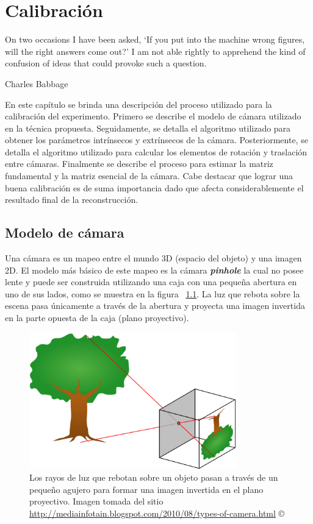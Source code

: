\chapter{Calibraci\'{o}n}
\label{chap:calibracion}
\epigraph{On two occasions I have been asked, ‘If you put into the machine wrong figures, will the right answers come out?’  I am not able rightly to apprehend the kind of confusion of ideas that could provoke such a question.}{Charles Babbage}

En este cap\'{i}tulo se brinda una descripci\'{o}n del proceso utilizado para la calibraci\'{o}n del experimento. Primero se describe el modelo de c\'{a}mara utilizado en la t\'{e}cnica propuesta. Seguidamente, se detalla el algoritmo utilizado para obtener los par\'{a}metros intr\'{i}nsecos y extr\'{i}nsecos de la c\'{a}mara. Posteriormente, se detalla el algoritmo utilizado para calcular los elementos de rotaci\'{o}n y traslaci\'{o}n entre c\'{a}maras. Finalmente se describe el proceso para estimar la matriz fundamental y la matriz esencial de la c\'{a}mara. Cabe destacar que lograr una buena calibraci\'{o}n es de suma importancia dado que afecta considerablemente el resultado final de la reconstrucci\'{o}n.


\section{Modelo de c\'{a}mara}
Una c\'{a}mara es un mapeo entre el mundo 3D (espacio del objeto) y una imagen 2D. El modelo m\'{a}s b\'{a}sico de este mapeo es la c\'{a}mara \textit{\textbf{pinhole}} la cual no posee lente y puede ser construida utilizando una caja con una peque\~na abertura en uno de sus lados, como se muestra en la figura ~\ref{fig:Pinhole1}. La luz que rebota sobre la escena pasa \'{u}nicamente a trav\'{e}s de la abertura y proyecta una imagen invertida en la parte opuesta de la caja (plano proyectivo). 


\begin{figure}[H]
\centering
\includegraphics[width=0.8\textwidth]{images/pinhole1.png}
\caption[Modelo b\'{a}sico de c\'{a}mara \textit{pinhole}]%
{Los rayos de luz que rebotan sobre un objeto pasan a trav\'{e}s de un peque\~no agujero para formar una imagen invertida en el plano proyectivo. Imagen tomada del sitio \url{http://mediainfotain.blogspot.com/2010/08/types-of-camera.html} \copyright}
\label{fig:Pinhole1}
\end{figure}


